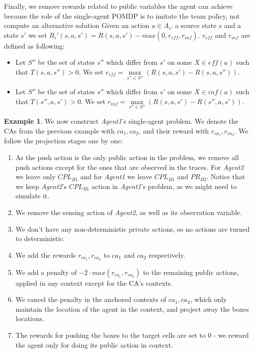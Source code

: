 \documentclass[letterpaper]{article}
\theoremstyle{definition}
\newtheorem{example}{Example}
\newcommand{\eliran}[1]{\textbf{[\color{red}ELIRAN:#1]}}
\newcommand{\eff}{\mathit{eff}}
\newcommand{\infl}{\mathit{inf}}
\begin{document}
Finally, we remove rewards related to public variables the agent can achieve because the role of the single-agent POMDP is to imitate the team policy, not compute an alternative solution
Given an action $a \in A_i$, a source state $s$ and a state $s'$ we set $R_i'(s,a,s')=R(s,a,s') - \textit{max}\left(0, r_{\eff}, r_{\infl}\right)$. $r_{\eff}$ and $r_{\infl}$ are defined as following:
\begin{itemize}
\item Let $S''$ be the set of states $s''$ which differ from $s'$ on some $X\in \eff(a)$ such that $T(s,a,s'')>0$. We set $r_{\eff}=\max\limits_{s''\in S''} \left(R(s,a,s') - R(s,a,s'')\right)$.
\item Let $S''$ be the set of states $s''$ which differ from $s'$ on some $X\in \infl(a)$ such that $T(s'',a,s')>0$. We set $r_{\infl}=\max\limits_{s''\in S''} \left(R(s,a,s') - R(s'',a,s')\right)$.
\end{itemize}

\begin{example}
We now construct \emph{Agent1}'s single-agent problem. We denote the CAs from the previous example with $ca_1, ca_2$, and their reward with $r_{ca_1}, r_{ca_2}$. We follow the projection stages one by one:
\begin{enumerate}
    \item As the push action is the only public action in the problem, we remove all push actions except for the ones that are observed in the traces. For \emph{Agent2} we leave only $CPL_{B1}$ and for \emph{Agent1} we leave $CPL_{B1}$ and $PR_{B2}$. Notice that we keep \emph{Agent2}'s $CPL_{B1}$ action in \emph{Agent1}'s problem, as we might need to simulate it.
    \item We remove the sensing action of \emph{Agent2}, as well as its observation variable.
    \item We don't have any non-deterministic private actions, so no actions are turned to deterministic.
    \item We add the rewards $r_{ca_1}, r_{ca_2}$ to  $ca_1$ and $ca_2$ respectively.
    \item We add a penalty of $-2\cdot max(r_{ca_1}, r_{ca_2})$ to the remaining public actions, applied in any context except for the CA's contexts.
    \item We cancel the penalty in the anchored contexts of $ca_1, ca_2$, which only maintain the location of the agent in the context, and project away the boxes locations.
    \item The rewards for pushing the boxes to the target cells are set to 0 - we reward the agent only for doing its public action in context.
\end{enumerate}
\end{example}
\end{document}
